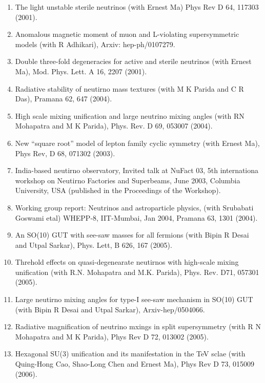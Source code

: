 \begin{enumerate}
\item The light unstable sterile neutrinos (with Ernest Ma) Phys Rev D 64, 117303 (2001).

\item Anomalous magnetic moment of muon and L-violating supersymmetric models (with R Adhikari), Arxiv: hep-ph/0107279.

\item Double three-fold degeneracies for active and sterile neutrinos (with Ernest Ma), Mod. Phys. Lett. A 16, 2207 (2001).

\item Radiative stability of neutirno mass textures (with M K Parida and C R Das), Pramana 62, 647 (2004).

\item High scale mixing unification and large neutrino mixing angles (with RN Mohapatra and M K Parida), Phys. Rev. D 69, 053007 (2004).

\item New ``square root'' model of lepton family cyclic symmetry (with Ernest Ma), Phys Rev, D 68, 071302 (2003).

\item India-based neutirno observatory, Invited talk at NuFact 03, 5th internationa workshop on Neutirno Factories and Superbeams, June 2003, Columbia University, USA (published in the Proceedings of the Workshop).

\item Working group report: Neutrinos and astroparticle physics, (with Srubabati Goswami etal) WHEPP-8, IIT-Mumbai, Jan 2004, Pramana 63, 1301 (2004).

\item An SO(10) GUT with see-saw masses for all fermions (with Bipin R Desai and Utpal Sarkar), Phys. Lett, B 626, 167 (2005).

\item Threhold effects on quasi-degenearate neutirnos with high-scale mixing unification (with R.N. Mohapatra and M.K. Parida), Phys. Rev. D71, 057301 (2005).

\item Large neutirno mixing angles for type-I see-saw mechanism in SO(10) GUT (with Bipin R Desai and Utpal Sarkar), Arxiv-hep/0504066.

\item Radiative magnification of neutrino mxings in split supersymmetry (with R N Mohapatra and M K Parida), Phys Rev D 72, 013002 (2005).

\item Hexagonal SU(3) unification and its manifestation in the TeV sclae (with Quing-Hong Cao, Shao-Long Chen and Ernest Ma), Phys Rev D 73, 015009 (2006).


\end{enumerate}
